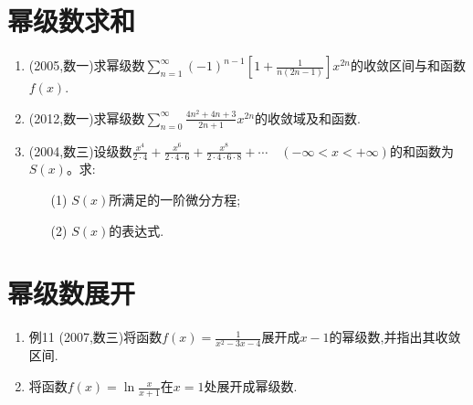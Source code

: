 \documentclass[12pt, a4paper, oneside, UTF8]{ctexbook}
\begin{document}
\section{幂级数求和}

\begin{enumerate}[label=\arabic*.,start=8]
    \item (2005,数一)求幂级数$\displaystyle\sum_{n=1}^{\infty}(-1)^{n-1}\left[1+\frac{1}{n(2n-1)}\right] x^{2n}$的收敛区间与和函数$f(x)$.
    
    \begin{solution}
    \newpage
    \end{solution}
    
    \item (2012,数一)求幂级数$\displaystyle\sum_{n=0}^{\infty}\frac{4n^2+4n+3}{2n+1} x^{2n}$的收敛域及和函数.
    
    \begin{solution}
    \newpage
    \end{solution}
    
    \item (2004,数三)设级数$\frac{x^4}{2\cdot 4}+\frac{x^6}{2\cdot 4\cdot 6}+\frac{x^8}{2\cdot 4\cdot 6\cdot 8}+\cdots\quad(-\infty<x<+\infty)$的和函数为$S(x)$。求:
    \begin{enumerate}[label=(\roman*)]
        \item[(1)] $S(x)$所满足的一阶微分方程;
        \item[(2)] $S(x)$的表达式.
    \end{enumerate}
    
    \begin{solution}
    \newpage
    \end{solution}
\end{enumerate}

\section{幂级数展开}

\begin{enumerate}[label=\arabic*.,start=11]
    \item 例11 (2007,数三)将函数$f(x)=\frac{1}{x^2-3x-4}$展开成$x-1$的幂级数,并指出其收敛区间.
    
    \begin{solution}
    \newpage
    \end{solution}
    
    \item 将函数$f(x)=\ln\frac{x}{x+1}$在$x=1$处展开成幂级数.
    
    \begin{solution}
    \newpage
    \end{solution}
\end{enumerate}
\end{document}
